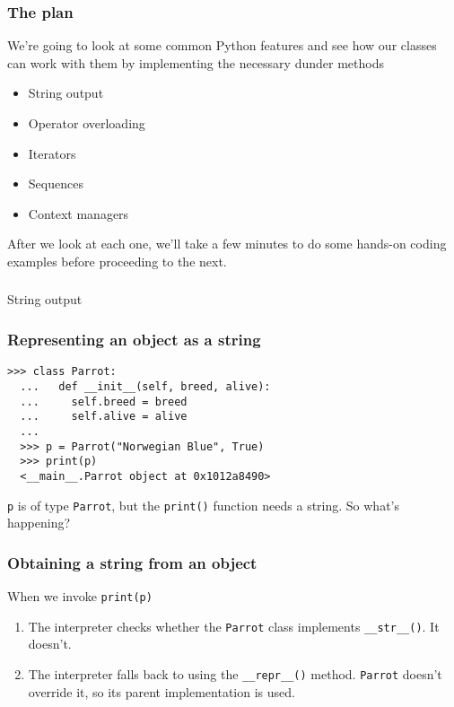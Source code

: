 \documentclass[aspectratio=169]{beamer}
\begin{document}
\begin{frame}
  \frametitle{The plan}
  
  We're going to look at some common Python features and see how our classes can work with them by implementing the necessary dunder methods
  
  \begin{itemize}
    \item String output
    \item Operator overloading
    \item Iterators
    \item Sequences
    \item Context managers
  \end{itemize}
  
  After we look at each one, we'll take a few minutes to do some hands-on coding examples before proceeding to the next.  
  \end{frame}
  
\begin{frame}
  \frametitle{} 
  \centerline{\huge String output}
 \end{frame}
 
\begin{frame}[fragile]
  \frametitle{Representing an object as a string}
  
  \begin{Verbatim}[commandchars=\\\{\}]
  >>> class Parrot:
  ...   def __init__(self, breed, alive):
  ...     self.breed = breed
  ...     self.alive = alive
  ...
  >>> p = Parrot("Norwegian Blue", True)
  >>> print(p)
  <__main__.Parrot object at 0x1012a8490>
  \end{Verbatim}
  
  \bigbreak
  \texttt{p} is of type \texttt{Parrot}, but the \texttt{print()} function needs a string. So what's happening?
  \end{frame}
  
\begin{frame}
  \frametitle{Obtaining a string from an object} 
  
   When we invoke \texttt{print(p)}
   
   \begin{enumerate}
     \item The interpreter checks whether the \texttt{Parrot} class implements \texttt{\_\_str\_\_()}. It doesn't.
     \item The interpreter falls back to using the \texttt{\_\_repr\_\_()} method. \texttt{Parrot} doesn't override it, so its parent implementation is used.
   \end{enumerate}  
 \end{frame}
  
\end{document}
